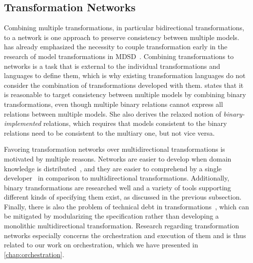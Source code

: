 \subsection{Transformation Networks}

Combining multiple transformations, in particular bidirectional transformations, to a network is one approach to preserve consistency between multiple models.
 has already emphasized the necessity to couple transformation early in the research of model transformations in \gls{MDSD}~\cite{laemmel2004coupledTransformations-WSET}.
Combining transformations to networks is a task that is external to the individual transformations and languages to define them, which is why existing transformation languages do not consider the combination of transformations developed with them.
\textcite{stevens2020BidirectionalTransformationLarge-SoSym} states that it is reasonable to target consistency between multiple models by combining binary transformations, even though multiple binary relations cannot express all relations between multiple models.
She also derives the relaxed notion of \emph{binary-implemented} relations, which requires that models consistent to the binary relations need to be consistent to the multiary one, but not vice versa.

Favoring transformation networks over multidirectional transformations is motivated by multiple reasons.
Networks are easier to develop when domain knowledge is distributed~, and they are easier to comprehend by a single developer~\cite{cleve2019dagstuhl, stevens2020BidirectionalTransformationLarge-SoSym} in comparison to multidirectional transformations.
Additionally, binary transformations are researched well and a variety of tools supporting different kinds of specifying them exist, as discussed in the previous subsection.
Finally, there is also the problem of technical debt in transformations~\cite{lano2018technicalDebt-ICMT}, which can be mitigated by modularizing the specification rather than developing a monolithic multidirectional transformation.
Research regarding transformation networks especially concerns the orchestration and execution of them and is thus related to our work on orchestration, which we have presented in \autoref{chap:orchestration}.

